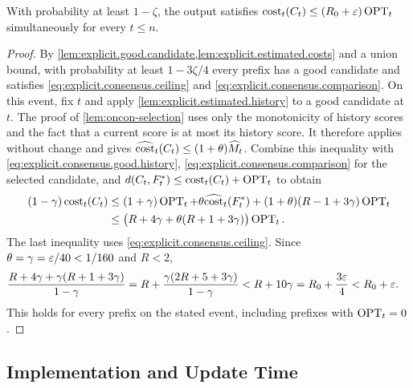 \begin{lemma}\label{lem:explicit.selected.cost}
With probability at least $ 1-\zeta $, the output satisfies $ \operatorname{cost}_t(C_t)\le(R_0+\varepsilon)\operatorname{OPT}_t $ simultaneously for every $ t\le n $.
\end{lemma}
\begin{proof}
By \cref{lem:explicit.good.candidate,lem:explicit.estimated.costs} and a union bound, with probability at least $ 1-3\zeta/4 $ every prefix has a good candidate and satisfies \eqref{eq:explicit.consensus.ceiling} and \eqref{eq:explicit.consensus.comparison}.
On this event, fix $ t $ and apply \cref{lem:explicit.estimated.history} to a good candidate at $ t $.
The proof of \cref{lem:oncon-selection} uses only the monotonicity of history scores and the fact that a current score is at most its history score.
It therefore applies without change and gives $ \widehat{\operatorname{cost}}_{t}(C_t)\le(1+\theta)\widehat M_{t} $.
Combine this inequality with \eqref{eq:explicit.consensus.good.history}, \eqref{eq:explicit.consensus.comparison} for the selected candidate, and $ d(C_t,F_t^*)\le\operatorname{cost}_t(C_t)+\operatorname{OPT}_t $ to obtain
\begin{align}
    (1-\gamma)\operatorname{cost}_t(C_t)
    &\le(1+\gamma)\operatorname{OPT}_t+\theta\widehat{\operatorname{cost}}_{t}(F_t^*)
        +(1+\theta)(R-1+3\gamma)\operatorname{OPT}_t\nonumber\\
    &\le\bigl(R+4\gamma+\theta(R+1+3\gamma)\bigr)\operatorname{OPT}_t.
    \label{eq:explicit.consensus.final.cost}
\end{align}
The last inequality uses \eqref{eq:explicit.consensus.ceiling}.
Since $ \theta=\gamma=\varepsilon/40<1/160 $ and $ R<2 $,
\begin{align}
    \frac{R+4\gamma+\gamma(R+1+3\gamma)}{1-\gamma}
    &=R+\frac{\gamma(2R+5+3\gamma)}{1-\gamma}
    <R+10\gamma
    =R_0+\frac{3\varepsilon}{4}
    <R_0+\varepsilon.
    \nonumber
\end{align}
This holds for every prefix on the stated event, including prefixes with $ \operatorname{OPT}_t=0 $.
\end{proof}

\subsection{Implementation and Update Time}\label{subsec:explicit.consensus.implementation}


